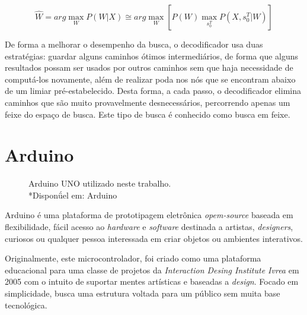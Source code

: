 \documentclass[12pt,a4paper,oneside]{report}
\begin{document}
\begin{equation}
\widehat{W} = arg \max _{W} P(W|X) \cong arg \max _{W} [P(W) \max _{s_{0}^{T}} P(X,s_{0}^{T}|W)]
\label{equ:viterbi}
\end{equation}

De forma a melhorar o desempenho da busca, o decodificador usa duas estratégias: guardar alguns caminhos ótimos intermediários, de forma que alguns resultados possam ser usados por outros caminhos sem que haja necessidade de computá-los novamente, além de realizar poda nos nós que se encontram abaixo de um limiar pré-estabelecido. Desta forma, a cada passo, o decodificador elimina caminhos que são muito provavelmente desnecessários, percorrendo apenas um feixe do espaço de busca. Este tipo de busca é conhecido como busca em feixe.

\section{Arduino}

\begin{figure}[h!]
\centering
{}\caption{Arduino UNO utilizado neste trabalho. \\ *\footnotesize Disponǘel em: Arduino \cite{arduino}}
\label{fig:arduino}
\end{figure}

Arduino \cite{arduino} é uma plataforma de prototipagem eletrônica \emph{opem-source} baseada em flexibilidade, fácil acesso ao \emph{hardware} e \emph{software} destinada a artistas, \emph{designers}, curiosos ou qualquer pessoa interessada em criar objetos ou ambientes interativos.

Originalmente, este microcontrolador, foi criado como uma plataforma educacional para uma classe de projetos da \emph{Interaction Desing Institute Ivrea} em 2005 com o intuito de suportar mentes artísticas e baseadas a \emph{design}. Focado em simplicidade, busca uma estrutura voltada para um público sem muita base tecnológica.
\end{document}
